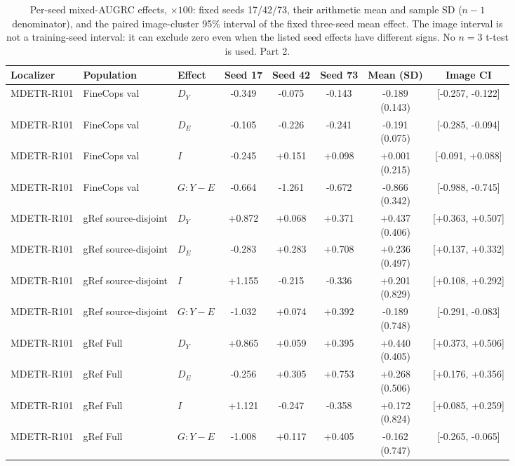 \begin{table}[t]
\centering\footnotesize
\setlength{\tabcolsep}{3pt}
\renewcommand{\arraystretch}{1.15}
\caption{Per-seed mixed-AUGRC effects, $\times100$: fixed seeds 17/42/73, their arithmetic mean and sample SD ($n-1$ denominator), and the paired image-cluster 95\% interval of the fixed three-seed mean effect. The image interval is not a training-seed interval: it can exclude zero even when the listed seed effects have different signs. No $n=3$ t-test is used. Part 2.}\label{tab:supp_v6_seed_effects_2}
\begin{tabular}{@{}lllccccc@{}}\toprule
Localizer & Population & Effect & Seed 17 & Seed 42 & Seed 73 & Mean (SD) & Image CI\\\midrule
MDETR-R101 & FineCops val & $D_Y$ & -0.349 & -0.075 & -0.143 & \shortstack{-0.189\\(0.143)} & [-0.257, -0.122]\\
MDETR-R101 & FineCops val & $D_E$ & -0.105 & -0.226 & -0.241 & \shortstack{-0.191\\(0.075)} & [-0.285, -0.094]\\
MDETR-R101 & FineCops val & $I$ & -0.245 & +0.151 & +0.098 & \shortstack{+0.001\\(0.215)} & [-0.091, +0.088]\\
MDETR-R101 & FineCops val & $G:Y-E$ & -0.664 & -1.261 & -0.672 & \shortstack{-0.866\\(0.342)} & [-0.988, -0.745]\\
MDETR-R101 & gRef source-disjoint & $D_Y$ & +0.872 & +0.068 & +0.371 & \shortstack{+0.437\\(0.406)} & [+0.363, +0.507]\\
MDETR-R101 & gRef source-disjoint & $D_E$ & -0.283 & +0.283 & +0.708 & \shortstack{+0.236\\(0.497)} & [+0.137, +0.332]\\
MDETR-R101 & gRef source-disjoint & $I$ & +1.155 & -0.215 & -0.336 & \shortstack{+0.201\\(0.829)} & [+0.108, +0.292]\\
MDETR-R101 & gRef source-disjoint & $G:Y-E$ & -1.032 & +0.074 & +0.392 & \shortstack{-0.189\\(0.748)} & [-0.291, -0.083]\\
MDETR-R101 & gRef Full & $D_Y$ & +0.865 & +0.059 & +0.395 & \shortstack{+0.440\\(0.405)} & [+0.373, +0.506]\\
MDETR-R101 & gRef Full & $D_E$ & -0.256 & +0.305 & +0.753 & \shortstack{+0.268\\(0.506)} & [+0.176, +0.356]\\
MDETR-R101 & gRef Full & $I$ & +1.121 & -0.247 & -0.358 & \shortstack{+0.172\\(0.824)} & [+0.085, +0.259]\\
MDETR-R101 & gRef Full & $G:Y-E$ & -1.008 & +0.117 & +0.405 & \shortstack{-0.162\\(0.747)} & [-0.265, -0.065]\\
\bottomrule\end{tabular}
\end{table}
